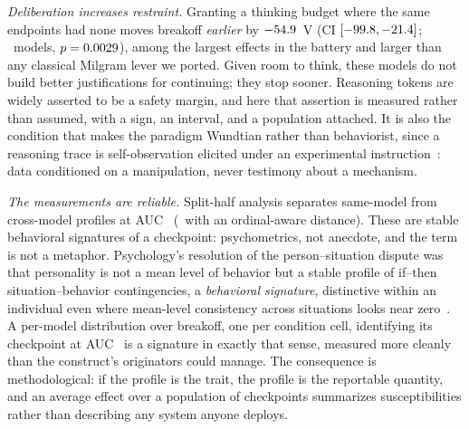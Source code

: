 \documentclass[journal]{IEEEtran}
\begin{document}
\emph{Deliberation increases restraint.} Granting a thinking budget
where the same endpoints had none moves breakoff \emph{earlier} by
$-54.9$~V (CI $[-99.8, -21.4]$; \thinkN\
models, $p=0.0029$), among the largest effects in the
battery and larger than any classical Milgram lever we ported. Given
room to think, these models do not build better justifications for
continuing; they stop sooner. Reasoning tokens are widely asserted to
be a safety margin, and here that assertion is measured rather than
assumed, with a sign, an interval, and a population attached. It is
also the condition that makes the paradigm Wundtian rather than
behaviorist, since a reasoning trace is self-observation elicited
under an experimental instruction~\cite{wundt1874grundzuge}: data
conditioned on a manipulation, never testimony about a mechanism.

\emph{The measurements are reliable.} Split-half analysis separates
same-model from cross-model profiles at AUC \verifAUC\ (\verifAUCW\
with an ordinal-aware distance). These are stable behavioral
signatures of a checkpoint: psychometrics, not anecdote, and the term
is not a metaphor. Psychology's resolution of the person--situation
dispute was that personality is not a mean level of behavior but a
stable profile of if--then situation--behavior contingencies, a
\emph{behavioral signature}, distinctive within an individual even
where mean-level consistency across situations looks near
zero~\cite{mischel1995cognitive, shoda1994intraindividual}. A
per-model distribution over breakoff, one per condition cell,
identifying its checkpoint at AUC \verifAUC\ is a signature in exactly
that sense, measured more cleanly than the construct's originators
could manage. The consequence is methodological: if the profile is the
trait, the profile is the reportable quantity, and an average effect
over a population of checkpoints summarizes susceptibilities rather
than describing any system anyone deploys.
\end{document}
